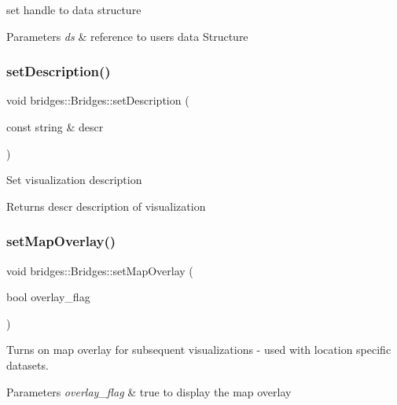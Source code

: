 set handle to data structure


\begin{DoxyParams}{Parameters}
{\em ds} & reference to user\textquotesingle{}s data Structure \\
\hline
\end{DoxyParams}
\mbox{\label{classbridges_1_1_bridges_aa26285a4d04c2759113dcf233406a8da}} 
\subsubsection{\texorpdfstring{set\+Description()}{setDescription()}}
{\footnotesize\ttfamily void bridges\+::\+Bridges\+::set\+Description (\begin{DoxyParamCaption}\item[{const string \&}]{descr }\end{DoxyParamCaption})\hspace{0.3cm}{\ttfamily [inline]}}

Set visualization description \begin{DoxyReturn}{Returns}
descr description of visualization 
\end{DoxyReturn}
\mbox{\label{classbridges_1_1_bridges_a221442c674b625a403486076cf8a7c03}} 
\subsubsection{\texorpdfstring{set\+Map\+Overlay()}{setMapOverlay()}}
{\footnotesize\ttfamily void bridges\+::\+Bridges\+::set\+Map\+Overlay (\begin{DoxyParamCaption}\item[{bool}]{overlay\+\_\+flag }\end{DoxyParamCaption})\hspace{0.3cm}{\ttfamily [inline]}}



Turns on map overlay for subsequent visualizations -\/ used with location specific datasets. 


\begin{DoxyParams}{Parameters}
{\em overlay\+\_\+flag} & true to display the map overlay \\
\hline
\end{DoxyParams}
\mbox{\label{classbridges_1_1_bridges_afa05302cf91c91b902aef693525107a5}} 
